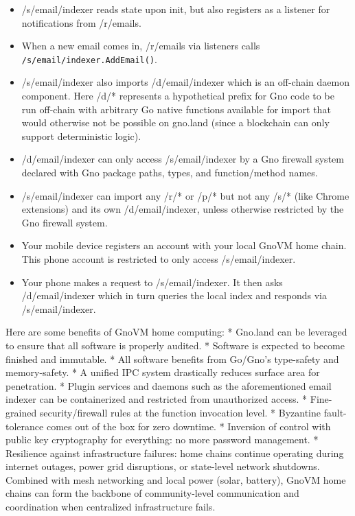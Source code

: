 \documentclass[12pt,a4paper]{article}
\newcommand{\passthrough}[1]{#1}
\begin{document}
\begin{itemize}
\item
  /s/email/indexer reads state upon init, but also registers as a
  listener for notifications from /r/emails.
\item
  When a new email comes in, /r/emails via listeners calls
  \passthrough{\lstinline!/s/email/indexer.AddEmail()!}.
\item
  /s/email/indexer also imports /d/email/indexer which is an off-chain
  daemon component. Here /d/* represents a hypothetical prefix for Gno
  code to be run off-chain with arbitrary Go native functions available
  for import that would otherwise not be possible on gno.land (since a
  blockchain can only support deterministic logic).
\item
  /d/email/indexer can only access /s/email/indexer by a Gno firewall
  system declared with Gno package paths, types, and function/method
  names.
\item
  /s/email/indexer can import any /r/* or /p/* but not any /s/* (like
  Chrome extensions) and its own /d/email/indexer, unless otherwise
  restricted by the Gno firewall system.
\item
  Your mobile device registers an account with your local GnoVM home
  chain. This phone account is restricted to only access
  /s/email/indexer.
\item
  Your phone makes a request to /s/email/indexer. It then asks
  /d/email/indexer which in turn queries the local index and responds
  via /s/email/indexer.
\end{itemize}

Here are some benefits of GnoVM home computing: * Gno.land can be
leveraged to ensure that all software is properly audited. * Software is
expected to become finished and immutable. * All software benefits from
Go/Gno's type-safety and memory-safety. * A unified IPC system
drastically reduces surface area for penetration. * Plugin services and
daemons such as the aforementioned email indexer can be containerized
and restricted from unauthorized access. * Fine-grained
security/firewall rules at the function invocation level. * Byzantine
fault-tolerance comes out of the box for zero downtime. * Inversion of
control with public key cryptography for everything: no more password
management. * Resilience against infrastructure failures: home chains
continue operating during internet outages, power grid disruptions, or
state-level network shutdowns. Combined with mesh networking and local
power (solar, battery), GnoVM home chains can form the backbone of
community-level communication and coordination when centralized
infrastructure fails.
\end{document}
